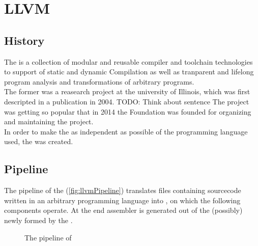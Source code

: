 \chapter{LLVM}
\section{History}
The \llvm is a collection of modular and reusable compiler and toolchain technologies to support of static and dynamic Compilation as well as tranparent and lifelong program analysis and transformations of arbitrary programs. \cite{LLVMWebsite, LLVMResearchBeginning}\\
The \llvm former was a reasearch project at the university of Illinois, which was first descripted in a publication in 2004. TODO: Think about sentence
The project was getting so popular that in 2014 the \llvm Foundation was founded for organizing and maintaining the project. \cite{LLVMFoundation}\\
In order to make the \llvm as independent as possible of the programming language used, the \llvmir was created.

\section{Pipeline \cite{IntroLLVM}}
The pipeline of the \llvm (\autoref{fig:llvmPipeline}) translates files containing sourcecode written in an arbitrary programming language into \llvmir, on which the following components operate.
At the end assembler is generated out of the (possibly) newly formed \llvmir by the \generator.
\begin{figure}[!ht]
    \caption{The pipeline of \llvm}
    \label{fig:llvmPipeline}
    \centering
\end{figure}\\
